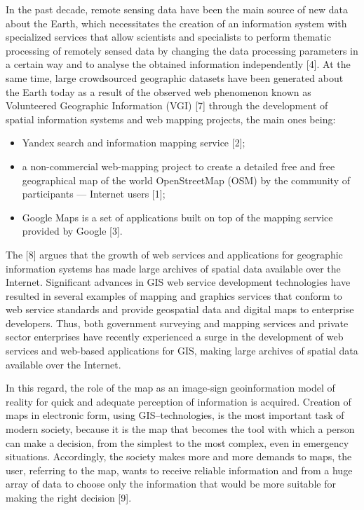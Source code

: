 \documentclass[10pt, letterpaper, twoside]{article}
\begin{document}
\begin{multicols}{2}
In the past decade, remote sensing data have been
the main source of new data about the Earth, which
necessitates the creation of an information system with
specialized services that allow scientists and specialists to perform thematic processing of remotely sensed
data by changing the data processing parameters in a
certain way and to analyse the obtained information
independently [4]. At the same time, large crowdsourced
geographic datasets have been generated about the Earth
today as a result of the observed web phenomenon
known as Volunteered Geographic Information (VGI) [7]
through the development of spatial information systems
and web mapping projects, the main ones being:
\begin{itemize}[noitemsep]
    \item Yandex search and information mapping service [2];
    \item a non-commercial web-mapping project to create  a detailed free and free geographical map of the world OpenStreetMap (OSM) by the community of participants — Internet users [1];
    \item Google Maps is a set of applications built on top of the mapping service provided by Google [3].
\end{itemize}

The [8] argues that the growth of web services and applications for geographic information systems has made
large archives of spatial data available over the Internet.
Significant advances in GIS web service development
technologies have resulted in several examples of mapping and graphics services that conform to web service
standards and provide geospatial data and digital maps to
enterprise developers. Thus, both government surveying
and mapping services and private sector enterprises have
recently experienced a surge in the development of web
services and web-based applications for GIS, making
large archives of spatial data available over the Internet.

In this regard, the role of the map as an image-sign
geoinformation model of reality for quick and adequate
perception of information is acquired. Creation of maps
in electronic form, using GIS–technologies, is the most
important task of modern society, because it is the map
that becomes the tool with which a person can make a
decision, from the simplest to the most complex, even
in emergency situations. Accordingly, the society makes
more and more demands to maps, the user, referring to
the map, wants to receive reliable information and from
a huge array of data to choose only the information that
would be more suitable for making the right decision [9].


\end{multicols}
\end{document}
